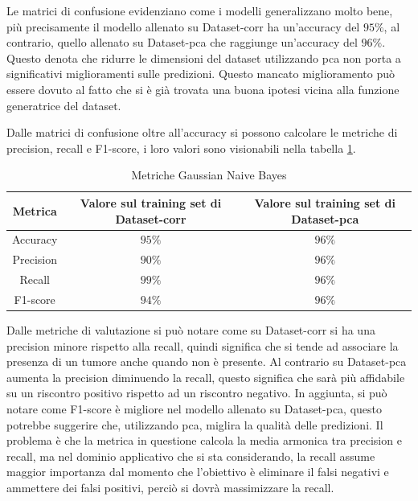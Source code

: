 Le matrici di confusione evidenziano come i modelli generalizzano molto bene, più
precisamente il modello allenato su Dataset-corr ha un'accuracy del $95\%$, al contrario,
quello allenato su Dataset-pca che raggiunge un'accuracy del $96\%$. Questo denota che 
ridurre le dimensioni del dataset utilizzando pca non porta a significativi miglioramenti
sulle predizioni. Questo mancato miglioramento può essere dovuto al fatto che si
è già trovata una buona ipotesi vicina alla funzione generatrice del dataset.

Dalle matrici di confusione oltre all'accuracy si possono calcolare le metriche
di precision, recall e F1-score, i loro valori sono visionabili nella tabella 
\ref{tab:risultatiBayes}.

\begin{table}[!ht]
    \centering
        
    \begin{tabular}{|c|c|c|}
        \hline
        \textbf{Metrica} & \textbf{Valore sul training set di Dataset-corr} & \textbf{Valore sul training set di Dataset-pca} \\
        \hline
        Accuracy & $95\%$ & $96\%$ \\
        \hline
        Precision & $90\%$ & $96\%$ \\
        \hline
        Recall & $99\%$ & $96\%$ \\
        \hline
        F1-score & $94\%$ & $96\%$ \\
        \hline
    \end{tabular}
    \caption{Metriche Gaussian Naive Bayes}
    \label{tab:risultatiBayes}
\end{table}

Dalle metriche di valutazione si può notare come su Dataset-corr si ha una precision
minore rispetto alla recall, quindi significa che si tende ad associare la presenza
di un tumore anche quando non è presente. Al contrario su Dataset-pca aumenta la
precision diminuendo la recall, questo significa che sarà più affidabile su un 
riscontro positivo rispetto ad un riscontro negativo. In aggiunta, si può notare 
come F1-score è migliore nel modello allenato su Dataset-pca, questo potrebbe
suggerire che, utilizzando pca, miglira la qualità delle predizioni. Il problema
è che la metrica in questione calcola la media armonica tra precision e recall,
ma nel dominio applicativo che si sta considerando, la recall assume maggior
importanza dal momento che l'obiettivo è eliminare il falsi negativi e ammettere
dei falsi positivi, perciò si dovrà massimizzare la recall.

